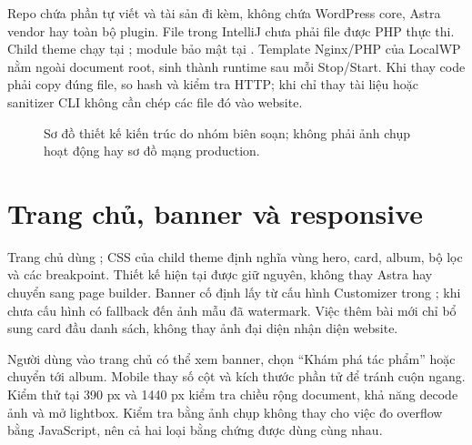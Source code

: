 Repo chứa phần tự viết và tài sản đi kèm, không chứa WordPress core, Astra vendor hay toàn bộ plugin. File trong IntelliJ chưa phải file được PHP thực thi. Child theme chạy tại ; module bảo mật tại . Template Nginx/PHP của LocalWP nằm ngoài document root, sinh thành runtime sau mỗi Stop/Start. Khi thay code phải copy đúng file, so hash và kiểm tra HTTP; khi chỉ thay tài liệu hoặc sanitizer CLI không cần chép các file đó vào website.

\begin{figure}[H]\centering
{}
\caption[Sơ đồ thiết kế kiến trúc]{Sơ đồ thiết kế kiến trúc do nhóm biên soạn; không phải ảnh chụp hoạt động hay sơ đồ mạng production.}\label{fig:architecture}
\end{figure}

\section{Trang chủ, banner và responsive}
Trang chủ dùng ; CSS của child theme định nghĩa vùng hero, card, album, bộ lọc và các breakpoint. Thiết kế hiện tại được giữ nguyên, không thay Astra hay chuyển sang page builder. Banner cố định lấy từ cấu hình Customizer trong ; khi chưa cấu hình có fallback đến ảnh mẫu đã watermark. Việc thêm bài mới chỉ bổ sung card đầu danh sách, không thay ảnh đại diện nhận diện website.

Người dùng vào trang chủ có thể xem banner, chọn ``Khám phá tác phẩm'' hoặc chuyển tới album. Mobile thay số cột và kích thước phần tử để tránh cuộn ngang. Kiểm thử tại 390 px và 1440 px kiểm tra chiều rộng document, khả năng decode ảnh và mở lightbox. Kiểm tra bằng ảnh chụp không thay cho việc đo overflow bằng JavaScript, nên cả hai loại bằng chứng được dùng cùng nhau.


